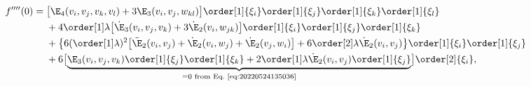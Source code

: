 \begin{equation*}
  \begin{aligned}[b]
    f''''(0) ={}
    & \bigl[ \E_4(v_i, v_j, v_k , v_l) + 3\E_3(v_i, v_j, w_{k l}) \bigr] \order[1]{\xi_i} \order[1]{\xi_j} \order[1]{\xi_k} \order[1]{\xi_l}\\
    & + 4 \order[1]\lambda \bigl[\dot{\E}_3(v_i, v_j, v_k) + 3 \dot{\E}_2(v_i, w_{j k})\bigr] \order[1]{\xi_i} \order[1]{\xi_j} \order[1]{\xi_k}\\
    & + \bigl\{6 ( \order[1]\lambda )^2 \bigl[ \ddot{\E}_2 (v_i, v_j) + \dot{\E}_2(v_i, w_j) + \dot{\E}_2(v_j, w_i) \bigr] + 6\order[2]\lambda \dot{\E}_2(v_i, v_j) \bigr\} \order[1]{\xi_i} \order[1]{\xi_j}\\
    & + 6\bigl[ \underbrace{\E_3(v_i, v_j, v_k) \order[1]{\xi_j} \order[1]{\xi_k} + 2 \order[1]\lambda \dot{\E}_2(v_i, v_j) \order[1]{\xi_j}}_{=0\text{ from Eq.~\eqref{eq:20220524135036}}} \bigr] \order[2]{\xi_i},
  \end{aligned}
\end{equation*}
